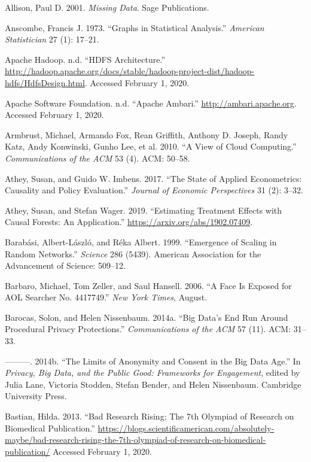 \documentclass[]{krantz}
\begin{document}
\hypertarget{ref-allison2001missing}{}
Allison, Paul D. 2001. \emph{Missing Data}. Sage Publications.

\hypertarget{ref-anscombe1973graphs}{}
Anscombe, Francis J. 1973. ``Graphs in Statistical Analysis.''
\emph{American Statistician} 27 (1): 17--21.

\hypertarget{ref-HDFS}{}
Apache Hadoop. n.d. ``HDFS Architecture.''
\url{http://hadoop.apache.org/docs/stable/hadoop-project-dist/hadoop-hdfs/HdfsDesign.html}.
Accessed February 1, 2020.

\hypertarget{ref-ApacheAmbari}{}
Apache Software Foundation. n.d. ``Apache Ambari.''
\url{http://ambari.apache.org}. Accessed February 1, 2020.

\hypertarget{ref-armbrust2010view}{}
Armbrust, Michael, Armando Fox, Rean Griffith, Anthony D. Joseph, Randy
Katz, Andy Konwinski, Gunho Lee, et al. 2010. ``A View of Cloud
Computing.'' \emph{Communications of the ACM} 53 (4). ACM: 50--58.

\hypertarget{ref-athey2017state}{}
Athey, Susan, and Guido W. Imbens. 2017. ``The State of Applied
Econometrics: Causality and Policy Evaluation.'' \emph{Journal of
Economic Perspectives} 31 (2): 3--32.

\hypertarget{ref-athey2019}{}
Athey, Susan, and Stefan Wager. 2019. ``Estimating Treatment Effects
with Causal Forests: An Application.''
\url{https://arxiv.org/abs/1902.07409}.

\hypertarget{ref-barabasi1999emergence}{}
Barabási, Albert-László, and Réka Albert. 1999. ``Emergence of Scaling
in Random Networks.'' \emph{Science} 286 (5439). American Association
for the Advancement of Science: 509--12.

\hypertarget{ref-barbaro2006face}{}
Barbaro, Michael, Tom Zeller, and Saul Hansell. 2006. ``A Face Is
Exposed for AOL Searcher No. 4417749.'' \emph{New York Times}, August.

\hypertarget{ref-barocas2014big}{}
Barocas, Solon, and Helen Nissenbaum. 2014a. ``Big Data's End Run Around
Procedural Privacy Protections.'' \emph{Communications of the ACM} 57
(11). ACM: 31--33.

\hypertarget{ref-barocas2014bigger}{}
---------. 2014b. ``The Limits of Anonymity and Consent in the Big Data
Age.'' In \emph{Privacy, Big Data, and the Public Good: Frameworks for
Engagement}, edited by Julia Lane, Victoria Stodden, Stefan Bender, and
Helen Nissenbaum. Cambridge University Press.

\hypertarget{ref-Bastian2013}{}
Bastian, Hilda. 2013. ``Bad Research Rising: The 7th Olympiad of
Research on Biomedical Publication.''
\url{https://blogs.scientificamerican.com/absolutely-maybe/bad-research-rising-the-7th-olympiad-of-research-on-biomedical-publication/}
Accessed February 1, 2020.
\end{document}

